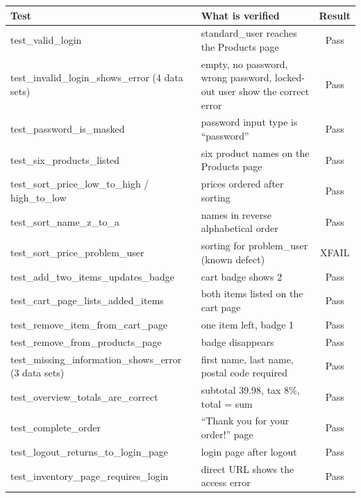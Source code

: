 \documentclass[12pt,a4paper]{article}
\begin{document}
\begin{center}
\renewcommand{\arraystretch}{1.3}
\begin{tabularx}{\textwidth}{|l|X|c|}
\hline
\textbf{Test} & \textbf{What is verified} & \textbf{Result}\\ \hline
test\_valid\_login & standard\_user reaches the Products page & Pass\\ \hline
test\_invalid\_login\_shows\_error (4 data sets) & empty, no password, wrong password, locked-out user show the correct error & Pass\\ \hline
test\_password\_is\_masked & password input type is ``password'' & Pass\\ \hline
test\_six\_products\_listed & six product names on the Products page & Pass\\ \hline
test\_sort\_price\_low\_to\_high / high\_to\_low & prices ordered after sorting & Pass\\ \hline
test\_sort\_name\_z\_to\_a & names in reverse alphabetical order & Pass\\ \hline
test\_sort\_price\_problem\_user & sorting for problem\_user (known defect) & XFAIL\\ \hline
test\_add\_two\_items\_updates\_badge & cart badge shows 2 & Pass\\ \hline
test\_cart\_page\_lists\_added\_items & both items listed on the cart page & Pass\\ \hline
test\_remove\_item\_from\_cart\_page & one item left, badge 1 & Pass\\ \hline
test\_remove\_from\_products\_page & badge disappears & Pass\\ \hline
test\_missing\_information\_shows\_error (3 data sets) & first name, last name, postal code required & Pass\\ \hline
test\_overview\_totals\_are\_correct & subtotal 39.98, tax 8\%, total = sum & Pass\\ \hline
test\_complete\_order & ``Thank you for your order!'' page & Pass\\ \hline
test\_logout\_returns\_to\_login\_page & login page after logout & Pass\\ \hline
test\_inventory\_page\_requires\_login & direct URL shows the access error & Pass\\ \hline
\end{tabularx}
\end{center}
\end{document}
